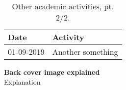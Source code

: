 \begin{appendices}
\begin{table}
\footnotesize
\begin{tabulary}{\linewidth}{LL}
  Date & Activity \\
  \hline
  \rule{0pt}{2.5ex}\mbox{01-09-2019} & Another something \\
  \hline
\end{tabulary}
\caption[Other academic activities, pt. 2/2]{Other academic activities, pt. 2/2.}
\label{table:appendix_activities_2}
\end{table}

\end{appendices}

\clearpage
\pagestyle{empty}

\noindent
\textbf{Back cover image explained}\\
Explanation

